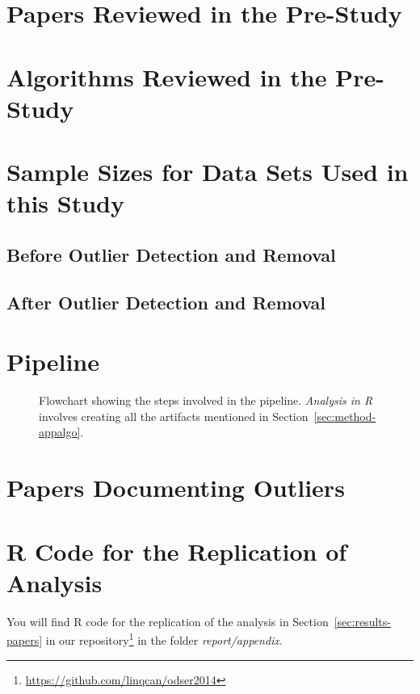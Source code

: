 \clearpage
\section{Papers Reviewed in the Pre-Study}
\label{sec:appendix-allpapers}





\clearpage
\section{Algorithms Reviewed in the Pre-Study}
\label{sec:appendix-allalgorithms}
\begin{landscape}

\end{landscape}




\clearpage
\section{Sample Sizes for Data Sets Used in this Study}
\subsection{Before Outlier Detection and Removal}
\label{sec:appendix-samplesizes}




\clearpage
\subsection{After Outlier Detection and Removal}
\label{sec:appendix-samplesizes-modified}




\clearpage
\section{Pipeline}
\label{sec:appendix-pipeline}
\begin{figure}[!h]
\centering
\caption{Flowchart showing the steps involved in the pipeline. \emph{Analysis in \textsf{R}} involves creating all the artifacts mentioned in Section~\ref{sec:method-appalgo}.}

\end{figure}




\clearpage
\section{Papers Documenting Outliers}
\label{sec:appendix-odpaperstable}







\clearpage
\section{R Code for the Replication of Analysis}
\label{sec:appendix-codeforanalysis}
You will find R code for the replication of the analysis in Section~\ref{sec:results-papers} in our repository\footnote{\url{https://github.com/linqcan/odser2014}} in the folder \emph{report/appendix}.
